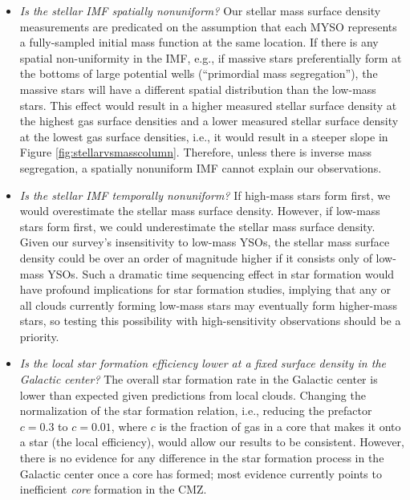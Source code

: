 \documentclass[twocolumn]{aastex61}
\begin{document}
\begin{itemize}
    \item \emph{Is the stellar IMF spatially nonuniform?}
        Our stellar mass surface density measurements are predicated on the
        assumption that each MYSO represents a fully-sampled initial mass
        function at the same location.  If there is any spatial non-uniformity
        in the IMF, e.g., if massive stars preferentially form at the bottoms
        of large potential wells (``primordial mass segregation''), the massive
        stars will have a different spatial distribution than the low-mass
        stars.  This effect would result in a higher measured stellar surface
        density at the highest gas surface densities and a lower measured
        stellar surface density at the lowest gas surface densities, i.e., it
        would result in a steeper slope in Figure
        \ref{fig:stellarvsmasscolumn}.  Therefore, unless there is inverse mass
        segregation, a spatially nonuniform IMF cannot explain our
        observations.

    \item \emph{Is the stellar IMF temporally nonuniform?}
        If high-mass stars form first, we would overestimate the stellar mass
        surface density.  However, if low-mass stars form first, we could
        underestimate the stellar mass surface density.  Given our survey's
        insensitivity to low-mass YSOs, the stellar mass surface density could
        be over an order of magnitude higher if it consists only of low-mass
        YSOs.  Such a dramatic time sequencing effect in star formation
        would have profound implications for star formation studies, implying
        that any or all clouds currently forming low-mass stars may eventually
        form higher-mass stars, so testing this possibility with
        high-sensitivity observations should be a priority.

    \item \emph{Is the \emph{local} star formation efficiency lower at a fixed surface
        density in the Galactic center?}
        The overall star formation rate in the Galactic center is lower than
        expected given predictions from local clouds.  Changing the
        normalization of the star formation relation, i.e., reducing the prefactor
        $c=0.3$ to $c=0.01$, where $c$ is the fraction of gas in a core that
        makes it onto a star (the local efficiency), would allow our results to
        be consistent.  However, there is no evidence for any difference in the
        star formation process in the Galactic center once a core has formed;
        most evidence currently points to inefficient \emph{core} formation in
        the CMZ.


\end{itemize}
\end{document}
